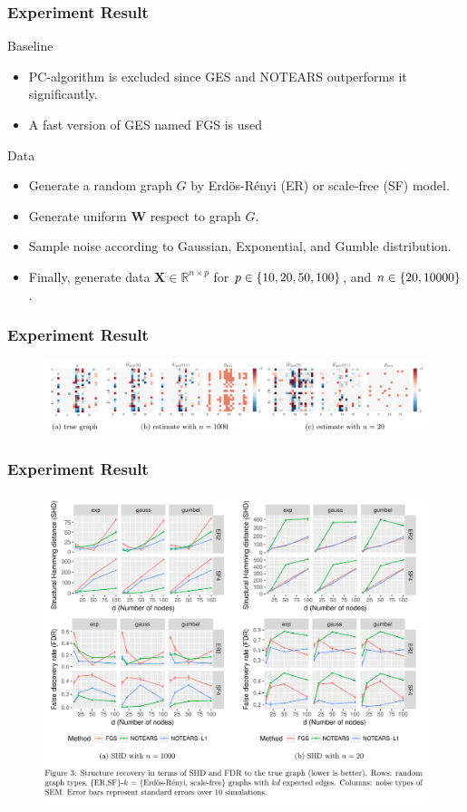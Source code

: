 \documentclass[10pt,xcolor={usenames,dvipsnames,table}]{beamer}
\begin{document}
\begin{frame}
    \frametitle{Experiment Result}
    Baseline
    \begin{itemize}
        \item PC-algorithm is excluded since GES and NOTEARS outperforms it significantly.
        \item A fast version of GES named FGS is used \citep{ramsey2017million}
    \end{itemize}
    Data
    \begin{itemize}
        \item Generate a random graph $G$ by Erdös-Rényi (ER) or scale-free (SF) model.
        \item Generate uniform $\bm{W}$ respect to graph $G$.
        \item Sample noise according to Gaussian, Exponential, and Gumble distribution.
        \item Finally, generate data $\bm{X} \in \mathbb{R}^{n \times p}$ for $p \in \left\{10, 20, 50, 100\right\}$, and $n \in \left\{20, 10000\right\}$.
    \end{itemize}
\end{frame}

\begin{frame}
    \frametitle{Experiment Result}
    \begin{figure}
        \centering
        \includegraphics[width=\textwidth]{figures/result1.png}
    \end{figure}
\end{frame}

\begin{frame}
    \frametitle{Experiment Result}
    \begin{figure}
        \centering
        \includegraphics[width=\textwidth]{figures/result2.png}
    \end{figure}
\end{frame}
\end{document}
